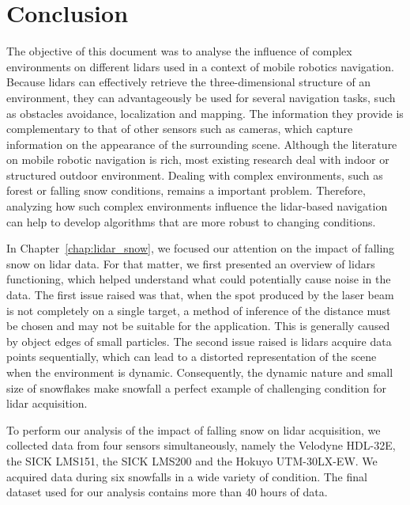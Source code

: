 \chapter*{Conclusion}

The objective of this document was to analyse the influence of complex environments on different \gls*{lidar}s used in a context of mobile robotics navigation. Because \gls*{lidar}s can effectively retrieve the three-dimensional structure of an environment, they can advantageously be used for several navigation tasks, such as obstacles avoidance, localization and mapping. The information they provide is complementary to that of other sensors such as cameras, which capture information on the appearance of the surrounding scene. Although the literature on mobile robotic navigation is rich, most existing research deal with indoor or structured outdoor environment. Dealing with complex environments, such as forest or falling snow conditions, remains a important problem. Therefore, analyzing how such complex environments influence the \gls*{lidar}-based navigation can help to develop algorithms that are more robust to changing conditions.

In Chapter~\ref{chap:lidar_snow}, we focused our attention on the impact of falling snow on \gls*{lidar} data. For that matter, we first presented an overview of \gls*{lidar}s functioning, which helped understand what could potentially cause noise in the data. The first issue raised was that, when the spot produced by the laser beam is not completely on a single target, a method of inference of the distance must be chosen and may not be suitable for the application. This is generally caused by object edges of small particles. The second issue raised is \gls*{lidar}s acquire data points sequentially, which can lead to a distorted representation of the scene when the environment is dynamic. Consequently, the dynamic nature and small size of snowflakes make snowfall a perfect example of challenging condition for \gls*{lidar} acquisition.

To perform our analysis of the impact of falling snow on \gls*{lidar} acquisition, we collected data from four sensors simultaneously, namely the Velodyne HDL-32E, the SICK LMS151, the SICK LMS200 and the Hokuyo UTM-30LX-EW. We acquired data during six snowfalls in a wide variety of condition. The final dataset used for our analysis contains more than 40 hours of data. 

